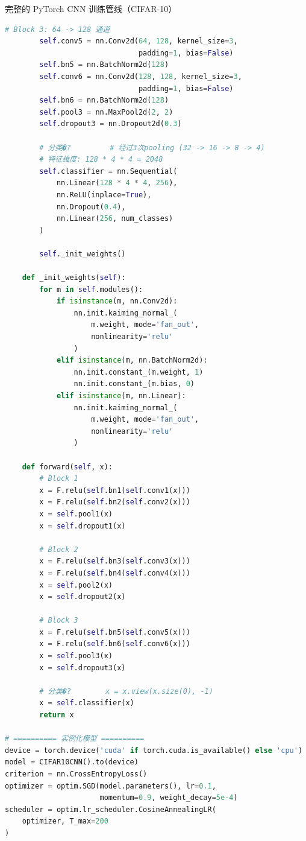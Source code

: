 \begin{mycode}{完整的 PyTorch CNN 训练管线（CIFAR-10）}
\begin{lstlisting}[language=Python]
        # Block 3: 64 -> 128 通道
        self.conv5 = nn.Conv2d(64, 128, kernel_size=3,
                               padding=1, bias=False)
        self.bn5 = nn.BatchNorm2d(128)
        self.conv6 = nn.Conv2d(128, 128, kernel_size=3,
                               padding=1, bias=False)
        self.bn6 = nn.BatchNorm2d(128)
        self.pool3 = nn.MaxPool2d(2, 2)
        self.dropout3 = nn.Dropout2d(0.3)

        # 分类�?         # 经过3次pooling (32 -> 16 -> 8 -> 4)
        # 特征维度: 128 * 4 * 4 = 2048
        self.classifier = nn.Sequential(
            nn.Linear(128 * 4 * 4, 256),
            nn.ReLU(inplace=True),
            nn.Dropout(0.4),
            nn.Linear(256, num_classes)
        )

        self._init_weights()

    def _init_weights(self):
        for m in self.modules():
            if isinstance(m, nn.Conv2d):
                nn.init.kaiming_normal_(
                    m.weight, mode='fan_out',
                    nonlinearity='relu'
                )
            elif isinstance(m, nn.BatchNorm2d):
                nn.init.constant_(m.weight, 1)
                nn.init.constant_(m.bias, 0)
            elif isinstance(m, nn.Linear):
                nn.init.kaiming_normal_(
                    m.weight, mode='fan_out',
                    nonlinearity='relu'
                )

    def forward(self, x):
        # Block 1
        x = F.relu(self.bn1(self.conv1(x)))
        x = F.relu(self.bn2(self.conv2(x)))
        x = self.pool1(x)
        x = self.dropout1(x)

        # Block 2
        x = F.relu(self.bn3(self.conv3(x)))
        x = F.relu(self.bn4(self.conv4(x)))
        x = self.pool2(x)
        x = self.dropout2(x)

        # Block 3
        x = F.relu(self.bn5(self.conv5(x)))
        x = F.relu(self.bn6(self.conv6(x)))
        x = self.pool3(x)
        x = self.dropout3(x)

        # 分类�?        x = x.view(x.size(0), -1)
        x = self.classifier(x)
        return x

# ========== 实例化模型 ==========
device = torch.device('cuda' if torch.cuda.is_available() else 'cpu')
model = CIFAR10CNN().to(device)
criterion = nn.CrossEntropyLoss()
optimizer = optim.SGD(model.parameters(), lr=0.1,
                      momentum=0.9, weight_decay=5e-4)
scheduler = optim.lr_scheduler.CosineAnnealingLR(
    optimizer, T_max=200
)


\end{lstlisting}
\end{mycode}
